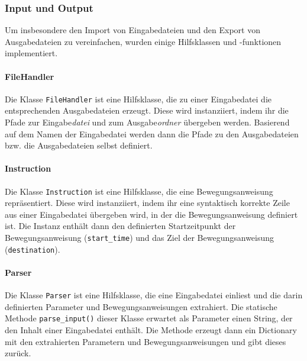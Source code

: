 \subsubsection{Input und Output}
\label{sssec:helper}

Um insbesondere den Import von Eingabedateien und den Export von Ausgabedateien zu vereinfachen, wurden einige Hilfsklassen und -funktionen implementiert.

\paragraph{FileHandler}
\label{sssec:filehandler}

Die Klasse \texttt{FileHandler} ist eine Hilfsklasse, die zu einer Eingabedatei die entsprechenden Ausgabedateien erzeugt.
Diese wird instanziiert, indem ihr die Pfade zur Eingabe\emph{datei} und zum Ausgabe\emph{ordner} übergeben werden.
Basierend auf dem Namen der Eingabedatei werden dann die Pfade zu den Ausgabedateien bzw. die Ausgabedateien selbst definiert.

\paragraph{Instruction}
\label{sssec:instruction}

Die Klasse \texttt{Instruction} ist eine Hilfsklasse, die eine Bewegungsanweisung repräsentiert.
Diese wird instanziiert, indem ihr eine syntaktisch korrekte Zeile aus einer Eingabedatei übergeben wird, in der die Bewegungsanweisung definiert ist.
Die Instanz enthält dann den definierten Startzeitpunkt der Bewegungsanweisung (\texttt{start\_time}) und das Ziel der Bewegungsanweisung (\texttt{destination}).

\paragraph{Parser}
\label{sssec:parser}

Die Klasse \texttt{Parser} ist eine Hilfsklasse, die eine Eingabedatei einliest und die darin definierten Parameter und Bewegungsanweisungen extrahiert.
Die statische Methode \texttt{parse\_input()} dieser Klasse erwartet als Parameter einen String, der den Inhalt einer Eingabedatei enthält.
Die Methode erzeugt dann ein Dictionary mit den extrahierten Parametern und Bewegungsanweisungen und gibt dieses zurück.

